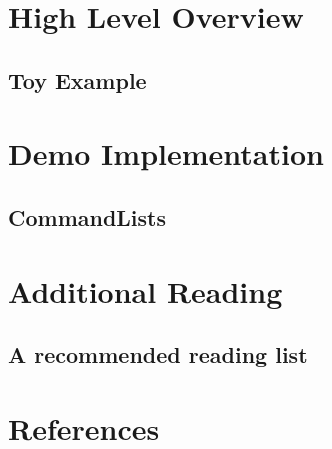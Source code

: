 \documentclass{beamer}
\begin{document}
  \section{High Level Overview}
	\subsection{Toy Example}
	\subsection{}
  \section{Demo Implementation}
  \subsection{CommandLists}
	\section{Additional Reading}
	\subsection{A recommended reading list}
	\section{References}
\end{document}
